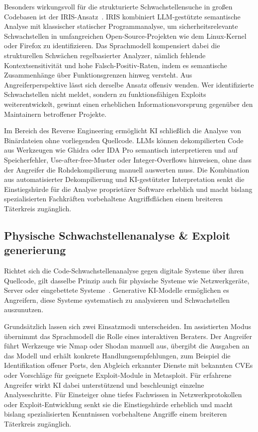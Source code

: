 Besonders wirkungsvoll für die strukturierte Schwachstellensuche in großen Codebasen ist der IRIS-Ansatz~\cite{li_iris_2024}. IRIS kombiniert LLM-gestützte semantische Analyse mit klassischer statischer Programmanalyse, um sicherheitsrelevante Schwachstellen in umfangreichen Open-Source-Projekten wie dem Linux-Kernel oder Firefox zu identifizieren. Das Sprachmodell kompensiert dabei die strukturellen Schwächen regelbasierter Analyzer, nämlich fehlende Kontextsensitivität und hohe Falsch-Positiv-Raten, indem es semantische Zusammenhänge über Funktionsgrenzen hinweg versteht. Aus Angreiferperspektive lässt sich derselbe Ansatz offensiv wenden. Wer identifizierte Schwachstellen nicht meldet, sondern zu funktionsfähigen Exploits weiterentwickelt, gewinnt einen erheblichen Informationsvorsprung gegenüber den Maintainern betroffener Projekte.
\newline

Im Bereich des Reverse Engineering ermöglicht KI schließlich die Analyse von Binärdateien ohne vorliegenden Quellcode. LLMs können dekompilierten Code aus Werkzeugen wie Ghidra oder IDA Pro semantisch interpretieren und auf Speicherfehler, Use-after-free-Muster oder Integer-Overflows hinweisen, ohne dass der Angreifer die Rohdekompilierung manuell auswerten muss. Die Kombination aus automatisierter Dekompilierung und KI-gestützter Interpretation senkt die Einstiegshürde für die Analyse proprietärer Software erheblich und macht bislang spezialisierten Fachkräften vorbehaltene Angriffsflächen einem breiteren Täterkreis zugänglich.

\subsection{Physische Schwachstellenanalyse \& Exploit generierung}
Richtet sich die Code-Schwachstellenanalyse gegen digitale Systeme über ihren Quellcode, gilt dasselbe Prinzip auch für physische Systeme wie Netzwerkgeräte, Server oder eingebettete Systeme~\cite{kuzlu_role_2021,zhukabayeva_cybersecurity_2025}. Generative KI-Modelle ermöglichen es Angreifern, diese Systeme systematisch zu analysieren und Schwachstellen auszunutzen.

Grundsätzlich lassen sich zwei Einsatzmodi unterscheiden. Im assistierten Modus übernimmt das Sprachmodell die Rolle eines interaktiven Beraters. Der Angreifer führt Werkzeuge wie Nmap oder Shodan manuell aus, übergibt die Ausgaben an das Modell und erhält konkrete Handlungsempfehlungen, zum Beispiel die Identifikation offener Ports, den Abgleich erkannter Dienste mit bekannten CVEs oder Vorschläge für geeignete Exploit-Module in Metasploit. Für erfahrene Angreifer wirkt KI dabei unterstützend und beschleunigt einzelne Analyseschritte. Für Einsteiger ohne tiefes Fachwissen in Netzwerkprotokollen oder Exploit-Entwicklung senkt sie die Einstiegshürde erheblich und macht bislang spezialisierten Kenntnissen vorbehaltene Angriffe einem breiteren Täterkreis zugänglich.

